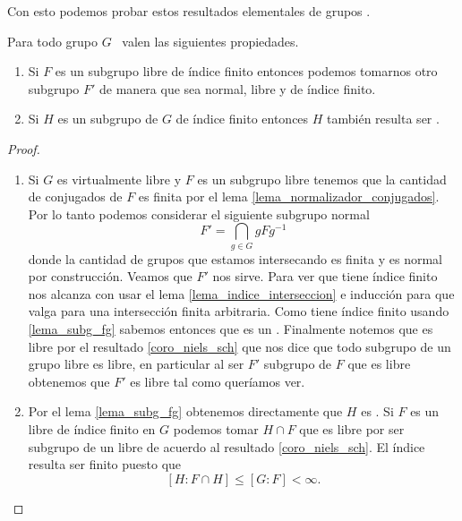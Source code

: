 \documentclass[tesis.tex]{subfiles}
\begin{document}
Con esto podemos probar estos resultados elementales de grupos \vl.

\begin{prop}\label{prop_vls}
	Para todo grupo $G$ \vl \ valen las siguientes propiedades.
	\begin{enumerate}
		\item Si $F$ es un subgrupo libre de índice finito entonces podemos tomarnos otro subgrupo $F'$ de manera que sea normal, libre y de índice finito.
		\item Si $H$ es un subgrupo de $G$ de índice finito entonces $H$ también resulta ser \vl.
	\end{enumerate}
\end{prop}

\begin{proof}
	\begin{enumerate}
		\item Si $G$ es virtualmente libre y $F$ es un subgrupo libre tenemos que la cantidad de conjugados de $F$ es finita por el lema \ref{lema_normalizador_conjugados}.
		Por lo tanto podemos considerar el siguiente subgrupo normal
		\[
		F' = \bigcap_{g \in G} gFg^{-1}
		\]
		donde la cantidad de grupos que estamos intersecando es finita y es normal por construcción.
		Veamos que $F'$ nos sirve. 
		Para ver que tiene índice finito nos alcanza con usar el lema \ref{lema_indice_interseccion} e inducción para que valga para una intersección finita arbitraria.
		Como tiene índice finito usando \ref{lema_subg_fg} sabemos entonces que es un \fg.
		Finalmente notemos que es libre por el resultado \ref{coro_niels_sch} que nos dice que todo subgrupo de un grupo libre es libre, en particular al ser $F'$ subgrupo de $F$ que es libre obtenemos que $F'$ es libre tal como queríamos ver.
		
		\item Por el lema \ref{lema_subg_fg} obtenemos directamente que $H$ es \fg.
		Si $F$ es un libre de índice finito en $G$ podemos tomar $H \cap F$ que es libre por ser subgrupo de un libre de acuerdo al resultado \ref{coro_niels_sch}.
		El índice resulta ser finito puesto que 
		\[
		[H:F\cap H] \le [G:F] < \infty.
		\]
	\end{enumerate}
\end{proof}
\end{document}
